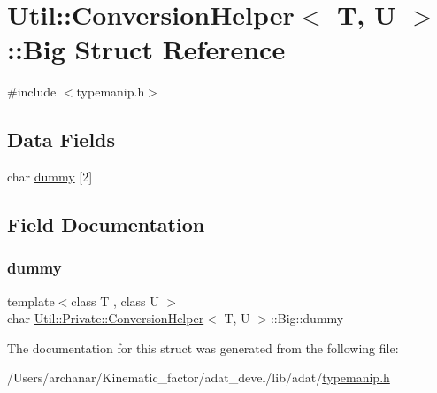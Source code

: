 \hypertarget{structUtil_1_1Private_1_1ConversionHelper_1_1Big}{}\section{Util\+:\+:Conversion\+Helper$<$ T, U $>$\+:\+:Big Struct Reference}
\label{structUtil_1_1Private_1_1ConversionHelper_1_1Big}


{\ttfamily \#include $<$typemanip.\+h$>$}

\subsection*{Data Fields}
\begin{DoxyCompactItemize}
\item 
char \mbox{\hyperlink{structUtil_1_1Private_1_1ConversionHelper_1_1Big_a4c34beb9a09656f84a7c21d4ff219a59}{dummy}} \mbox{[}2\mbox{]}
\end{DoxyCompactItemize}


\subsection{Field Documentation}
\mbox{\label{structUtil_1_1Private_1_1ConversionHelper_1_1Big_a4c34beb9a09656f84a7c21d4ff219a59}} 
\subsubsection{\texorpdfstring{dummy}{dummy}}
{\footnotesize\ttfamily template$<$class T , class U $>$ \\
char \mbox{\hyperlink{structUtil_1_1Private_1_1ConversionHelper}{Util\+::\+Private\+::\+Conversion\+Helper}}$<$ T, U $>$\+::Big\+::dummy}



The documentation for this struct was generated from the following file\+:\begin{DoxyCompactItemize}
\item 
/\+Users/archanar/\+Kinematic\+\_\+factor/adat\+\_\+devel/lib/adat/\mbox{\hyperlink{lib_2adat_2typemanip_8h}{typemanip.\+h}}\end{DoxyCompactItemize}
